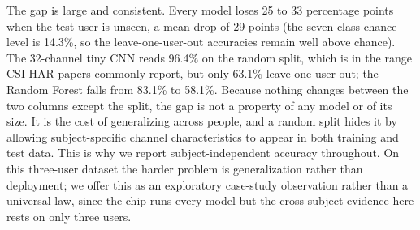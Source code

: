 \documentclass{ieeeaccess}
\begin{document}
The gap is large and consistent. Every model loses 25 to 33 percentage points when the test user is unseen, a mean drop of 29 points (the seven-class chance level is 14.3\%, so the leave-one-user-out accuracies remain well above chance). The 32-channel tiny CNN reads 96.4\% on the random split, which is in the range CSI-HAR papers commonly report, but only 63.1\% leave-one-user-out; the Random Forest falls from 83.1\% to 58.1\%. Because nothing changes between the two columns except the split, the gap is not a property of any model or of its size. It is the cost of generalizing across people, and a random split hides it by allowing subject-specific channel characteristics to appear in both training and test data. This is why we report subject-independent accuracy throughout. On this three-user dataset the harder problem is generalization rather than deployment; we offer this as an exploratory case-study observation rather than a universal law, since the chip runs every model but the cross-subject evidence here rests on only three users.

\begin{table}[t]
\caption{Cross-subject generalization gap on CSI-HAR. Identical models, features, and training; the only difference is the split. ``Random'' is a stratified 80/20 split over three seeds, in which each user appears in both train and test; ``LOUO'' is subject-independent leave-one-user-out over the three users. The gap is the accuracy lost when the test person is unseen. These values come from the dedicated generalization-gap run and differ by about a point from the corresponding entries in Table~\ref{tab:frontier} owing to different random seeds; both lie within the fold-to-fold variance.}
\label{tab:gengap}
\centering
\footnotesize
{}
\end{table}
\end{document}
